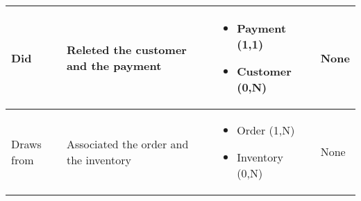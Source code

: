 \begin{longtable}{|p{}|p{} |p{}|p{} |}
Did & Releted the customer and the payment & \begin{itemize}
	\vspace{-1em}
	\item Payment (1,1)
	\item Customer  (0,N)
\end{itemize}
&  None \\\hline

Draws from & Associated the order and the inventory & \begin{itemize}
	\vspace{-1em}
	\item Order (1,N)
	\item Inventory  (0,N)
\end{itemize}
&  None \\\hline


\end{longtable}